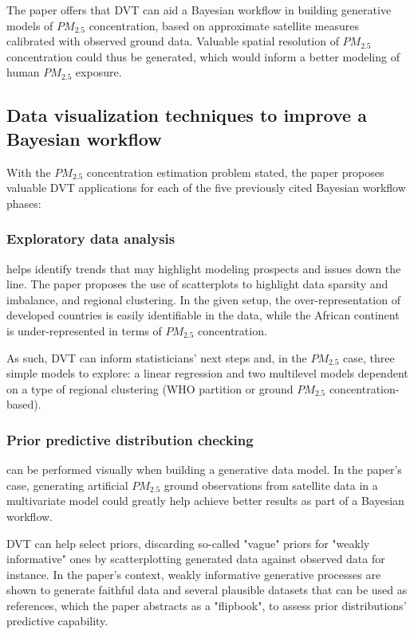 \documentclass[runningheads]{llncs}
\begin{document}
The paper offers that DVT can aid a Bayesian workflow in building generative models of $PM_{2.5}$ concentration, based on approximate satellite measures calibrated with observed ground data. Valuable spatial resolution of $PM_{2.5}$ concentration could thus be generated, which would inform a better modeling of human $PM_{2.5}$ exposure.

\subsection*{Data visualization techniques to improve a Bayesian workflow}
 
With the $PM_{2.5}$ concentration estimation problem stated, the paper proposes valuable DVT applications for each of the five previously cited Bayesian workflow phases:
 
\subsubsection{Exploratory data analysis} helps identify trends that may highlight modeling prospects and issues down the line. The paper proposes the use of scatterplots to highlight data sparsity and imbalance, and regional clustering. In the given setup, the over-representation of developed countries is easily identifiable in the data, while the African continent is under-represented in terms of $PM_{2.5}$ concentration. 

As such, DVT can inform statisticians' next steps and, in the $PM_{2.5}$ case, three simple models to explore: a linear regression and two multilevel models dependent on a type of regional clustering (WHO partition or ground $PM_{2.5}$ concentration-based).\\
 
\subsubsection{Prior predictive distribution checking} can be performed visually when building a generative data model. In the paper's case, generating artificial $PM_{2.5}$ ground observations from satellite data in a multivariate model could greatly help achieve better results as part of a Bayesian workflow.

DVT can help select priors, discarding so-called "vague" priors for "weakly informative" ones by scatterplotting generated data against observed data for instance. In the paper's context, weakly informative generative processes are shown to generate faithful data and several plausible datasets that can be used as references, which the paper abstracts as a "flipbook", to assess prior distributions' predictive capability.
  
\end{document}
